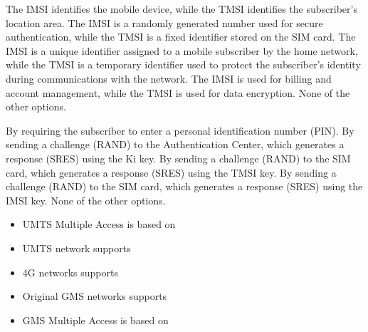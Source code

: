 \begin{checkboxes}
    \choice The IMSI identifies the mobile device, while the TMSI identifies the subscriber's location area.
    \choice The IMSI is a randomly generated number used for secure authentication, while the TMSI is a fixed identifier stored on the SIM card.
    \CorrectChoice The IMSI is a unique identifier assigned to a mobile subscriber by the home network, while the TMSI is a temporary identifier used to protect the subscriber's identity during communications with the network.
    \choice The IMSI is used for billing and account management, while the TMSI is used for data encryption.
    \choice None of the other options.
\end{checkboxes}

\begin{checkboxes}
    \choice By requiring the subscriber to enter a personal identification number (PIN).
    \choice By sending a challenge (RAND) to the Authentication Center, which generates a response (SRES) using the Ki key.
    \choice By sending a challenge (RAND) to the SIM card, which generates a response (SRES) using the TMSI key.
    \choice By sending a challenge (RAND) to the SIM card, which generates a response (SRES) using the IMSI key.
    \CorrectChoice None of the other options.
\end{checkboxes}

\begin{solution}
    \begin{itemize}
        \item UMTS Multiple Access is based on 
        \item UMTS network supports 
        \item 4G networks supports 
        \item Original GMS networks supports 
        \item GMS Multiple Access is based on 
    \end{itemize}
\end{solution}

